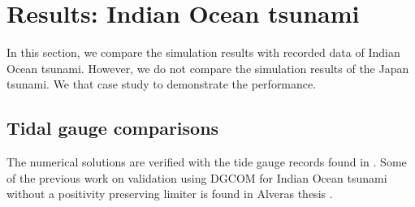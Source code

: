 \section{Results: Indian Ocean tsunami}
\label{sec:results}
In this section, we compare the simulation results with recorded data of Indian Ocean tsunami. However, we do not compare the simulation results of the Japan tsunami. We that case study to demonstrate the performance.  
\subsection{Tidal gauge comparisons}
The numerical solutions are verified with the tide gauge records found in  \cite{gaugerecords}. Some of the previous work on validation using DGCOM \cite{gopalakrishnan2011tsunami} for Indian Ocean tsunami without a positivity preserving limiter is found in Alveras thesis \cite{alevras2009simulating}.

